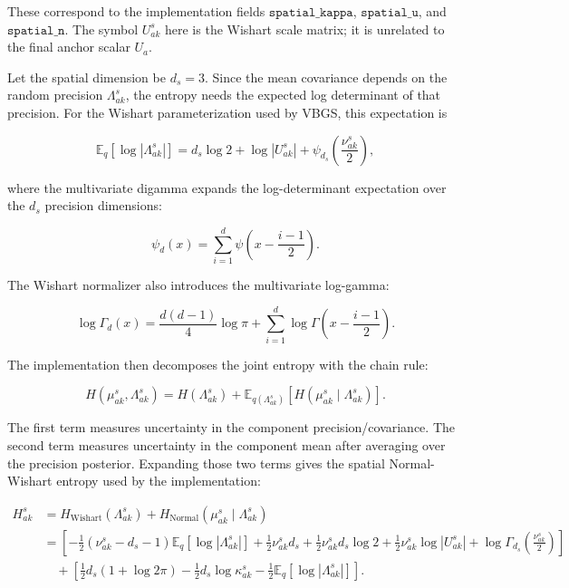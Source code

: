 \documentclass[11pt]{article}
\newcommand{\E}{\mathbb{E}}
\begin{document}
These correspond to the implementation fields
\(\texttt{spatial\_kappa}\), \(\texttt{spatial\_u}\), and
\(\texttt{spatial\_n}\). The symbol \(U^s_{ak}\) here is the Wishart scale
matrix; it is unrelated to the final anchor scalar \(U_a\).

Let the spatial dimension be \(d_s = 3\). Since the mean covariance depends on
the random precision \(\Lambda^s_{ak}\), the entropy needs the expected log
determinant of that precision. For the Wishart parameterization used by VBGS,
this expectation is

\[
  \E_q[\log |\Lambda^s_{ak}|]
  =
  d_s \log 2
  +
  \log |U^s_{ak}|
  +
  \psi_{d_s}
  \left(
    \frac{\nu^s_{ak}}{2}
  \right),
\]

where the multivariate digamma expands the log-determinant expectation over
the \(d_s\) precision dimensions:

\[
  \psi_d(x)
  =
  \sum_{i=1}^{d}
  \psi
  \left(
    x - \frac{i-1}{2}
  \right).
\]

The Wishart normalizer also introduces the multivariate log-gamma:

\[
  \log \Gamma_d(x)
  =
  \frac{d(d-1)}{4}\log \pi
  +
  \sum_{i=1}^{d}
  \log \Gamma
  \left(
    x - \frac{i-1}{2}
  \right).
\]

The implementation then decomposes the joint entropy with the chain rule:

\[
  H(\mu^s_{ak}, \Lambda^s_{ak})
  =
  H(\Lambda^s_{ak})
  +
  \E_{q(\Lambda^s_{ak})}
  \left[
    H(\mu^s_{ak} \mid \Lambda^s_{ak})
  \right].
\]

The first term measures uncertainty in the component precision/covariance. The
second term measures uncertainty in the component mean after averaging over the
precision posterior. Expanding those two terms gives the spatial
Normal-Wishart entropy used by the implementation:

\[
\begin{aligned}
  H^s_{ak}
  &=
  H_{\mathrm{Wishart}}(\Lambda^s_{ak})
  +
  H_{\mathrm{Normal}}(\mu^s_{ak} \mid \Lambda^s_{ak}) \\
  &=
  \left[
    -\frac{1}{2}(\nu^s_{ak} - d_s - 1)
      \E_q[\log |\Lambda^s_{ak}|]
    + \frac{1}{2}\nu^s_{ak} d_s
    + \frac{1}{2}\nu^s_{ak} d_s \log 2
    + \frac{1}{2}\nu^s_{ak}\log |U^s_{ak}|
    + \log \Gamma_{d_s}
      \left(
        \frac{\nu^s_{ak}}{2}
      \right)
  \right] \\
  &\quad+
  \left[
    \frac{1}{2}d_s(1 + \log 2\pi)
    - \frac{1}{2}d_s\log \kappa^s_{ak}
    - \frac{1}{2}\E_q[\log |\Lambda^s_{ak}|]
  \right].
\end{aligned}
\]
\end{document}
